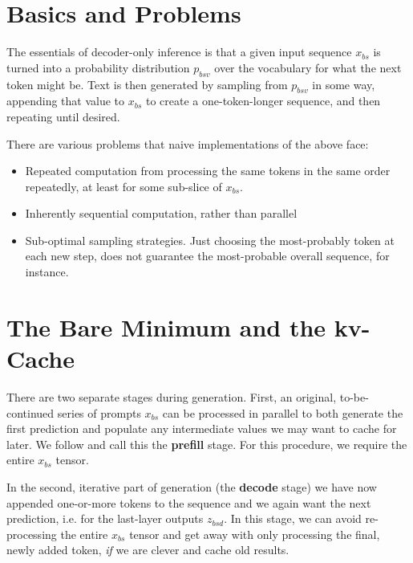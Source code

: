 \documentclass[11pt]{article}
\begin{document}
\section{Basics and Problems}


The essentials of decoder-only inference is that a given input sequence $ x _{ bs } $ is turned into
a probability distribution $ p _{ bsv } $ over the vocabulary for what the next token might be.  Text
is then generated by sampling from $ p _{ bsv } $ in some way, appending that value to $ x _{ bs } $
to create a one-token-longer sequence, and then repeating until desired.

There are various problems that naive implementations of the above face:
\begin{itemize}
    \item Repeated computation from processing the same tokens in the same order repeatedly, at least for
        some sub-slice of $ x _{ bs } $.
    \item Inherently sequential computation, rather than parallel
    \item Sub-optimal sampling strategies. Just choosing the most-probably token at each new step, does
    not guarantee the most-probable overall sequence, for instance.
\end{itemize}

\section{The Bare Minimum and the kv-Cache \label{sec_kv_cache}}


There are two separate stages during generation. First, an original, to-be-continued series of prompts
$ x _{ bs }  $ can be processed in parallel to both generate the first prediction and populate any
intermediate values we may want to cache for later. We follow \cite{pope2022efficiently} and call this the
\textbf{prefill} stage. For this procedure, we require the entire $ x _{ bs } $ tensor.

In the second, iterative part of generation (the \textbf{decode} stage) we have now appended
one-or-more tokens to the sequence and we again want the next prediction, i.e. 
for the last-layer outputs $ z _{ bsd } $. In this stage, we can avoid re-processing the entire $ x
_{ bs } $ tensor and get away with only processing the final, newly added token, \textit{if} we are
clever and cache old results.
\end{document}
